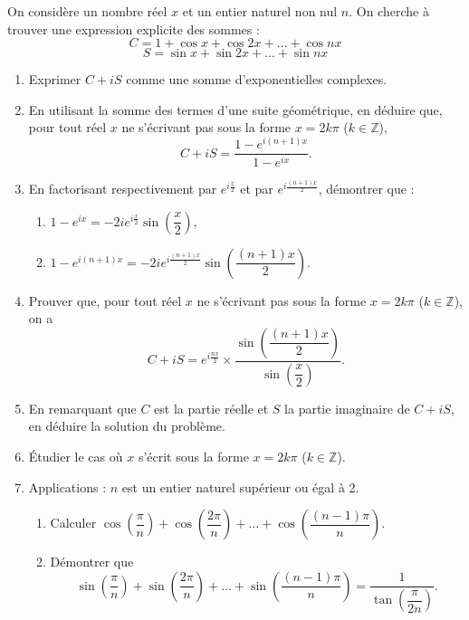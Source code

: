 \documentclass[a4paper,12pt]{article}
\begin{document}
\begin{tcolorbox}[title={Exercice 26}]
On considère un nombre réel \( x \) et un entier naturel non nul \( n \). On cherche à trouver une expression explicite des sommes :  
\[
C = 1 + \cos x + \cos 2x + \dots + \cos nx
\]
\[
S = \sin x + \sin 2x + \dots + \sin nx
\]

\begin{enumerate}
    \item Exprimer \( C + iS \) comme une somme d'exponentielles complexes.
    \item En utilisant la somme des termes d'une suite géométrique, en déduire que, pour tout réel \( x \) ne s'écrivant pas sous la forme \( x = 2k\pi \) (\( k \in \mathbb{Z} \)),
       \[
       C + iS = \dfrac{1 - e^{i(n+1)x}}{1 - e^{ix}}.
       \]
    \item En factorisant respectivement par \( e^{i\frac{x}{2}} \) et par \( e^{i\frac{(n+1)x}{2}} \), démontrer que :  
       \begin{enumerate}
           \item \( 1 - e^{ix} = -2i e^{i\frac{x}{2}} \sin\left( \dfrac{x}{2} \right) \),
           \item \( 1 - e^{i(n+1)x} = -2i e^{i\frac{(n+1)x}{2}} \sin\left( \dfrac{(n+1)x}{2} \right) \).
       \end{enumerate}
    \item Prouver que, pour tout réel \( x \) ne s'écrivant pas sous la forme \( x = 2k\pi \) (\( k \in \mathbb{Z} \)), on a
       \[
       C + iS = e^{i \frac{n x}{2}} \times \dfrac{\sin\left( \dfrac{(n+1)x}{2} \right)}{\sin\left( \dfrac{x}{2} \right)}.
       \]
    \item En remarquant que \( C \) est la partie réelle et \( S \) la partie imaginaire de \( C + iS \), en déduire la solution du problème.
    \item Étudier le cas où \( x \) s'écrit sous la forme \( x = 2k\pi \) (\( k \in \mathbb{Z} \)).
    \item Applications : \( n \) est un entier naturel supérieur ou égal à 2.
       \begin{enumerate}
           \item Calculer \( \cos\left( \dfrac{\pi}{n} \right) + \cos\left( \dfrac{2\pi}{n} \right) + \dots + \cos\left( \dfrac{(n-1)\pi}{n} \right) \).
           \item Démontrer que
           \[
             \sin\left( \dfrac{\pi}{n} \right) + \sin\left( \dfrac{2\pi}{n} \right) + \dots + \sin\left( \dfrac{(n-1)\pi}{n} \right) = \dfrac{1}{\tan\left( \dfrac{\pi}{2n} \right)}.
           \]
       \end{enumerate}
\end{enumerate}
\end{tcolorbox}
\end{document}

